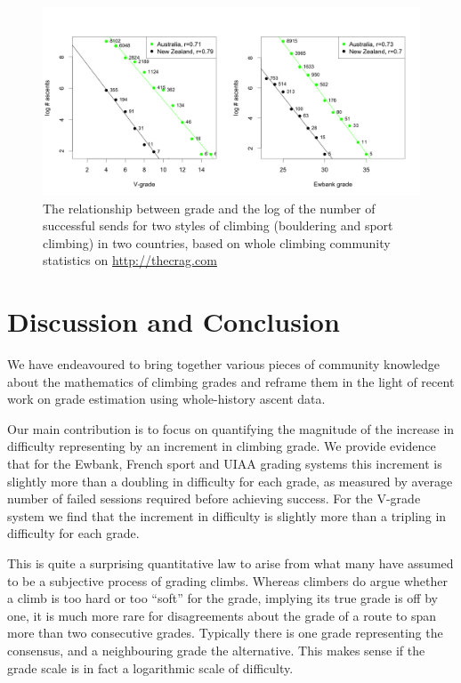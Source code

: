 \documentclass{article}
\begin{document}
\begin{figure}
\centering
\includegraphics[width=\textwidth]{figure1.png}
\caption{\small The relationship between grade and the log of the number of successful sends for two styles of climbing (bouldering and sport climbing) in two countries, based on whole climbing community statistics on \url{http://thecrag.com}}
\label{fig.oneill}
\end{figure}

\section*{Discussion and Conclusion}

We have endeavoured to bring together various pieces of community knowledge about the mathematics of climbing grades and reframe them in the light of recent work on grade estimation using whole-history ascent data.

Our main contribution is to focus on quantifying the magnitude of the increase in difficulty representing by an increment in climbing grade. We provide evidence that for the Ewbank, French sport and UIAA grading systems this increment is slightly more than a doubling in difficulty for each grade, as measured by average number of failed sessions required before achieving success. For the V-grade system we find that the increment in difficulty is slightly more than a tripling in difficulty for each grade.

This is quite a surprising quantitative law to arise from what many have assumed to be a subjective process of grading climbs. Whereas climbers do argue whether a climb is too hard or too ``soft'' for the grade, implying its true grade is off by one, it is much more rare for disagreements about the grade of a route to span more than two consecutive grades. Typically there is one grade representing the consensus, and a neighbouring grade the alternative. This makes sense if the grade scale is in fact a logarithmic scale of difficulty.  
\end{document}
